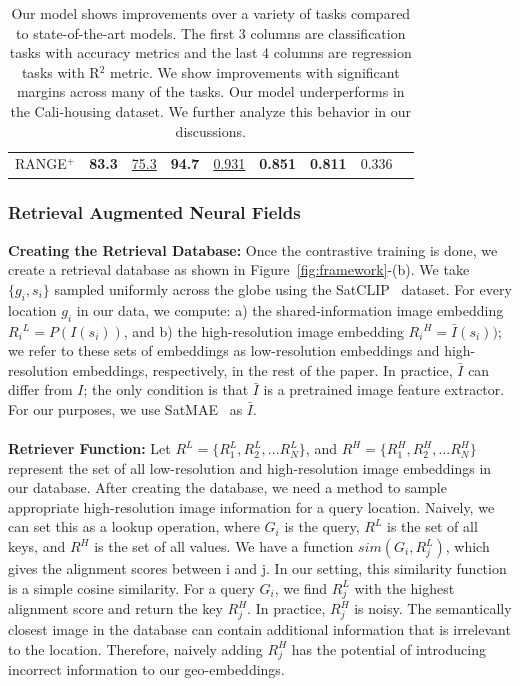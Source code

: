 \begin{table}
{\begin{tabular}{l|ccc|ccccc}
RANGE$^+$                      & \textbf{83.3} & \underline{75.3} & \textbf{94.7} &\underline{0.931} & \textbf{0.851} & \textbf{0.811} & 0.336 &    \\ 
\end{tabular}
}
\caption{Our model shows improvements over a variety of tasks compared to state-of-the-art models. The first 3 columns are classification tasks with accuracy metrics and the last 4 columns are regression tasks with R$^2$ metric. We show improvements with significant margins across many of the tasks. Our model underperforms in the Cali-housing dataset. We further analyze this behavior in our discussions.}
\label{table:main}
\end{table}

\subsubsection{Retrieval Augmented Neural Fields}
\noindent \textbf{Creating the Retrieval Database: }Once the contrastive training is done, we create a retrieval database as shown in Figure~\ref{fig:framework}-(b). We take $\{g_i, s_i\}$ sampled uniformly across the globe using the SatCLIP~\cite{klemmer2023satclip} dataset. For every location $g_i$ in our data, we compute: a) the shared-information image embedding $R_i{^L}=P(I(s_i))$, and b) the high-resolution image embedding $R_i{^H}=\bar{I}(s_i))$; we refer to these sets of embeddings as low-resolution embeddings and high-resolution embeddings, respectively, in the rest of the paper. In practice, $\bar{I}$ can differ from $I$; the only condition is that $\bar{I}$ is a pretrained image feature extractor. For our purposes, we use SatMAE~\cite{cong2022satmae} as $\bar{I}$. 
\\
\\
\noindent \textbf{Retriever Function: }
Let $R^L=\{R_{1}^L, R_{2}^L,...R_{N}^L\}$, and $R^H=\{R_{1}^H, R_{2}^H,...R_{N}^H\}$ represent the set of all low-resolution and high-resolution image embeddings in our database. After creating the database, we need a method to sample appropriate high-resolution image information for a query location. Naively, we can set this as a lookup operation, where $G_i$ is the query, $R^L$ is the set of all keys, and $R^H$ is the set of all values. We have a function $sim(G_i, R_{j}^{L})$, which gives the alignment scores between i and j. In our setting, this similarity function is a simple cosine similarity. For a query $G_i$, we find $R_{j}^{L}$ with the highest alignment score and return the key $R_{j}^{H}$. 
In practice, $R_{j}^{H}$ is noisy. The semantically closest image in the database can contain additional information that is irrelevant to the location. Therefore, naively adding $R_{j}^{H}$ has the potential of introducing incorrect information to our geo-embeddings. 



